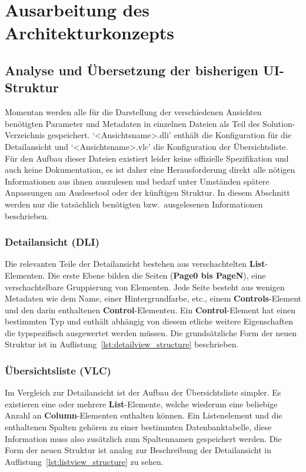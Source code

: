 \chapter{Ausarbeitung des Architekturkonzepts}\label{chap:concept}
\section{Analyse und Übersetzung der bisherigen UI-Struktur}\label{sec:ui_structure_translation}
Momentan werden alle für die Darstellung der verschiedenen Ansichten benötigten Parameter und Metadaten in einzelnen Dateien als Teil des Solution-Verzeichnis gespeichert. `<Ansichtsname>.dli' enthält die Konfiguration für die Detailansicht und `<Ansichtsname>.vlc' die Konfiguration der Übersichtsliste. Für den Aufbau dieser Dateien existiert leider keine offizielle Spezifikation und auch keine Dokumentation, es ist daher eine Herausforderung direkt alle nötigen Informationen aus ihnen auszulesen und bedarf unter Umständen spätere Anpassungen am Auslesetool oder der künftigen Struktur. In diesem Abschnitt werden nur die tatsächlich benötigten bzw.\ ausgelesenen Informationen beschrieben.

\subsection{Detailansicht (DLI)}
Die relevanten Teile der Detailansicht bestehen aus verschachtelten \textbf{List}-Elementen. Die erste Ebene bilden die Seiten (\textbf{Page0 bis PageN}), eine verschachtelbare Gruppierung von Elementen. Jede Seite besteht aus wenigen Metadaten wie dem Name, einer Hintergrundfarbe, etc., einem \textbf{Controls}-Element und den darin enthaltenen \textbf{Control}-Elementen. Ein \textbf{Control}-Element hat einen bestimmten Typ und enthält abhängig von diesem etliche weitere Eigenschaften die typspezifisch ausgewertet werden müssen. Die grundsätzliche Form der neuen Struktur ist in Auflistung~\ref{lst:detailview_structure} beschrieben.



\subsection{Übersichtsliste (VLC)}
Im Vergleich zur Detailansicht ist der Aufbau der Übersichtsliste simpler. Es existieren eine oder mehrere \textbf{List}-Elemente, welche wiederum eine beliebige Anzahl an \textbf{Column}-Elementen enthalten können. Ein Listenelement und die enthaltenen Spalten gehören zu einer bestimmten Datenbanktabelle, diese Information muss also zusätzlich zum Spaltennamen gespeichert werden. Die Form der neuen Struktur ist analog zur Beschreibung der Detailansicht in Auflistung~\ref{lst:listview_structure} zu sehen.

